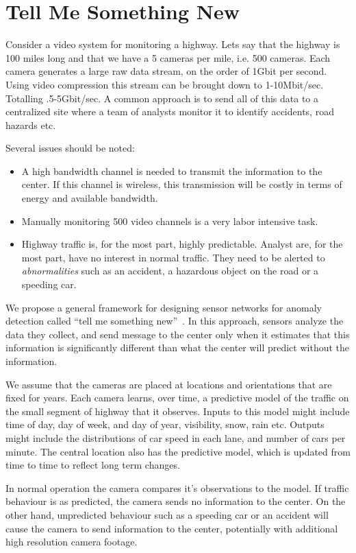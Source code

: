 \section{Tell Me Something New}\label{sec:TMSN}

Consider a video system for monitoring a highway. Lets say that the
highway is 100 miles long and that we have a 5 cameras per mile,
i.e. 500 cameras. Each camera generates a large raw data stream, on
the order of 1Gbit per second. Using video compression this stream can
be brought down to 1-10Mbit/sec. Totalling .5-5Gbit/sec. A common approach
is to send all of this data to a centralized site where a team of
analysts monitor it to identify accidents, road hazards etc.

Several issues should be noted:
\begin{itemize}
\item A high bandwidth channel is needed to transmit the information
  to the center. If this channel is wireless, this transmission will
  be costly in terms of energy and available bandwidth.
\item Manually monitoring 500 video channels is a very labor intensive task. 
\item Highway traffic is, for the most part, highly
  predictable. Analyst are, for the most part, have no interest in normal traffic. 
  They need to be alerted to {\em abnormalities} such as an accident, a hazardous 
  object on the road or a speeding car.
\end{itemize}

We propose a general framework for designing sensor networks for
anomaly detection called ``tell me something new''~\cite{TMSN}. In
this approach, sensors analyze the data they collect, and send message
to the center only when it estimates that this information is
significantly different than what the center will predict without the
information.

We assume that the cameras are placed at locations and orientations that are fixed for years.
Each camera learns, over time, a predictive model of the traffic on the small segment of 
highway that it observes. Inputs to this model might include time of day, day of week, and day of year, visibility, snow, rain etc. Outputs might include the distributions of car speed in each lane, and number of cars per minute.
The central location also has the predictive model, which is updated from time to time to reflect long term changes. 

In normal operation the camera compares it's observations to the model. If traffic behaviour is as predicted, the camera sends no information to the center. On the other hand, unpredicted behaviour such as a speeding car or an accident will cause the camera to send information to the center, potentially with additional high resolution camera footage.

